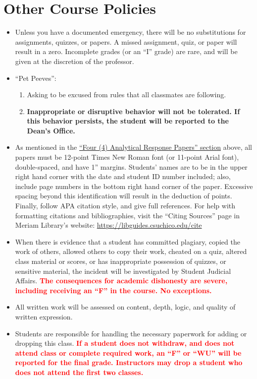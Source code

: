 \documentclass[11pt,]{article}
\providecommand{\tightlist}{%
  \setlength{\itemsep}{0pt}\setlength{\parskip}{0pt}}
\begin{document}
\hypertarget{other-course-policies}{%
\section{Other Course Policies}\label{other-course-policies}}

\begin{itemize}
\item
  Unless you have a documented emergency, there will be no substitutions
  for assignments, quizzes, or papers. A missed assignment, quiz, or
  paper will result in a zero. Incomplete grades (or an ``I'' grade) are
  rare, and will be given at the discretion of the professor.
\item
  ``Pet Peeves'':

  \begin{enumerate}
  \def\labelenumi{\arabic{enumi}.}
  \tightlist
  \item
    Asking to be excused from rules that all classmates are following.
  \item
    \textbf{Inappropriate or disruptive behavior will not be tolerated.
    If this behavior persists, the student will be reported to the
    Dean's Office.}
  \end{enumerate}
\item
  As mentioned in the \protect\hyperlink{writing_assignments}{``Four (4)
  Analytical Response Papers'' section} above, all papers must be
  12-point Times New Roman font (or 11-point Arial font), double-spaced,
  and have 1'' margins. Students' names are to be in the upper right
  hand corner with the date and student ID number included; also,
  include page numbers in the bottom right hand corner of the paper.
  Excessive spacing beyond this identification will result in the
  deduction of points. Finally, follow APA citation style, and give full
  references. For help with formatting citations and bibliographies,
  visit the ``Citing Sources'' page in Meriam Library's website:
  \url{https://libguides.csuchico.edu/cite}
\item
  When there is evidence that a student has committed plagiary, copied
  the work of others, allowed others to copy their work, cheated on a
  quiz, altered class material or scores, or has inappropriate
  possession of quizzes, or sensitive material, the incident will be
  investigated by Student Judicial Affairs.
  \textcolor{red}{\bf{The consequences for academic dishonesty are severe, including receiving an “F” in the course. No exceptions.}}
\item
  All written work will be assessed on content, depth, logic, and
  quality of written expression.
\item
  Students are responsible for handling the necessary paperwork for
  adding or dropping this class.
  \textcolor{red}{\bf{If a student does not withdraw, and does not attend class or complete required work, an “F” or “WU” will be reported for the final grade. Instructors may drop a student who does not attend the first two classes.}}
\end{itemize}
\end{document}
